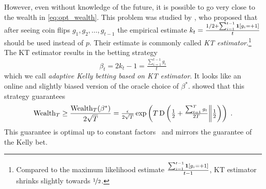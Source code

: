 However, even without knowledge of the future, it is possible to go very close to the wealth in \eqref{eq:opt_wealth}.
This problem was studied by \citet{Krichevsky-Trofimov-1981},
who proposed that after seeing coin flips $g_1, g_2, \dots, g_{t-1}$ the
empirical estimate $k_t = \frac{1/2 + \sum_{i=1}^{t-1} \mathbf{1}[g_i = +1]}{t}$
should be used instead of $p$. Their estimate is commonly called \emph{KT
estimator}.\footnote{Compared to the maximum likelihood estimate
$\frac{\sum_{i=1}^{t-1} \mathbf{1}[g_i = +1]}{t-1}$, KT estimator shrinks
slightly towards $\nicefrac{1}{2}$.} The KT estimator results in the betting strategy
\begin{equation}
\label{equation:kt-estimator-betting-strategy}
\beta_t = 2k_t - 1 = \tfrac{\sum_{i=1}^{t-1} g_i}{t}
\end{equation}
which we call \emph{adaptive Kelly betting based on KT estimator}. It looks like an online and slightly biased version of the oracle choice of $\beta^*$.
\citeauthor{Krichevsky-Trofimov-1981} showed that this strategy guarantees
\[
\operatorname{Wealth}_T \ge \frac{\operatorname{Wealth}_T(\beta^*)}{2\sqrt{T}}
= \tfrac{\epsilon}{2\sqrt{T}} \exp\left(T \operatorname{D}\left({\tfrac{1}{2}+\tfrac{\sum_{t=1}^T g_t}{2T}}\middle\|{\tfrac{1}{2}}\right)\right)\; .
\]
This guarantee is optimal up to constant factors~\citep{Cesa-Bianchi-Lugosi-2006} and mirrors the guarantee of
the Kelly bet.


